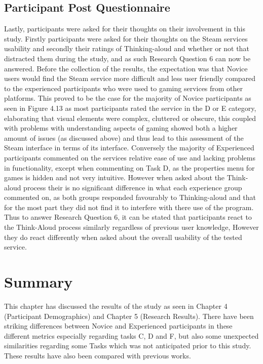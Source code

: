 \subsection{Participant Post Questionnaire}
Lastly, participants were asked for their thoughts on their involvement in this study. Firstly participants were asked for their thoughts on the Steam services usability and secondly their ratings of Thinking-aloud and whether or not that distracted them during the study, and as such Research Question 6 can now be answered. Before the collection of the results, the expectation was that Novice users would find the Steam service more difficult and less user friendly compared to the experienced participants who were used to gaming services from other platforms.  This proved to be the case for the majority of Novice participants as seen in Figure 4.13 as most participants rated the service in the D or E category, elaborating that visual elements were complex, cluttered or obscure, this coupled with problems with understanding aspects of gaming showed both a higher amount of issues (as discussed above) and thus lead to this assessment of the Steam interface in terms of its interface. Conversely the majority of Experienced participants commented on the services relative ease of use and lacking problems in functionality, except when commenting on Task D, as the properties menu for games is hidden and not very intuitive. However when asked about the Think-aloud process their is no significant difference in what each experience group commented on, as both groups responded favourably to Thinking-aloud and that for the most part they did not find it to interfere with there use of the program. Thus to answer Research Question 6, it can be stated that participants react to the Think-Aloud process similarly regardless of previous user knowledge, However they do react differently when asked about the overall usability of the tested service. 


\section{Summary}
This chapter has discussed the results of the study as seen in Chapter 4 (Participant Demographics) and Chapter 5 (Research Results). There have been striking differences between Novice and Experienced participants in these different metrics especially regarding tasks C, D and F, but also some unexpected similarities regarding some Tasks which was not anticipated prior to this study. These results have also been compared with previous works.  







